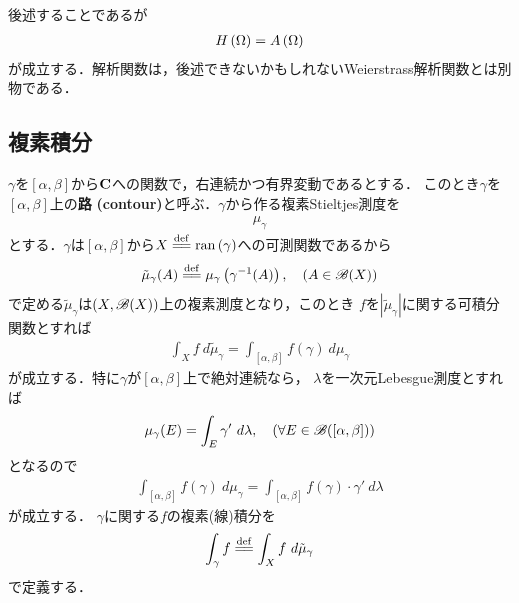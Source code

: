 	後述することであるが
	\begin{align}
		H\left(\Omega\right) = A\left(\Omega\right)
	\end{align}
	が成立する．解析関数は，後述できないかもしれないWeierstrass解析関数とは別物である．
	
\subsection{複素積分}
	$\gamma$を$[\alpha,\beta]$から$\mathbf{C}$への関数で，右連続かつ有界変動であるとする．
	このとき$\gamma$を$[\alpha,\beta]$上の{\bf 路}
	{\bf (contour)}と呼ぶ．$\gamma$から作る複素Stieltjes測度を
	\begin{align}
		\mu_\gamma
	\end{align}
	とする．$\gamma$は$[\alpha,\beta]$から$X \defeq \ran{\gamma}$への可測関数であるから
	\begin{align}
		\tilde{\mu}_\gamma(A) \defeq \mu_\gamma\left( \gamma^{-1}(A) \right),
		\quad (A \in \borel{X})
	\end{align}
	で定める$\tilde{\mu}_\gamma$は$(X,\mathscr{B}(X))$上の複素測度となり，このとき
	$f$を$|\tilde{\mu}_\gamma|$に関する可積分関数とすれば
	\begin{align}
		\int_X f\ d\tilde{\mu}_\gamma = \int_{[\alpha,\beta]} f(\gamma)\ d\mu_\gamma
	\end{align}
	が成立する．特に$\gamma$が$[\alpha,\beta]$上で絶対連続なら，
	$\lambda$を一次元Lebesgue測度とすれば
	\begin{align}
		\mu_\gamma(E) = \int_E \gamma'\ d\lambda,
		\quad (\forall E \in \mathscr{B}([\alpha,\beta]))
	\end{align}
	となるので
	\begin{align}
		\int_{[\alpha,\beta]} f(\gamma)\ d\mu_\gamma = \int_{[\alpha,\beta]} f(\gamma) \cdot \gamma'\ d\lambda
	\end{align}
	が成立する．
	$\gamma$に関する$f$の複素(線)積分を
	\begin{align}
		\int_\gamma f \defeq \int_X f\ d\tilde{\mu}_\gamma
	\end{align}
	で定義する．
	
